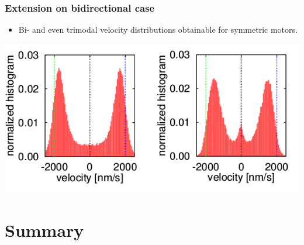 \documentclass[11pt]{beamer}
\begin{document}
\begin{frame}
 \frametitle{Extension on bidirectional case}
 \begin{itemize}
  \item Bi- and even trimodal velocity distributions obtainable for symmetric motors.
 \end{itemize}

 \begin{center}
  \includegraphics[scale=.6]{img/bidirectional.png}
 \end{center} 
 
\end{frame}








% 








\section{Summary}
\end{document}
